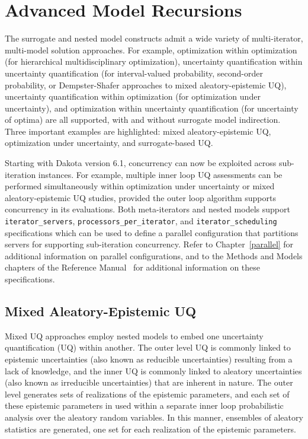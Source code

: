 \chapter{Advanced Model Recursions} \label{adv_models}


The surrogate and nested model constructs admit a wide variety of
multi-iterator, multi-model solution approaches. For example,
optimization within optimization (for hierarchical multidisciplinary
optimization), uncertainty quantification within uncertainty
quantification (for interval-valued probability, second-order
probability, or Dempster-Shafer approaches to mixed aleatory-epistemic
UQ), uncertainty quantification within optimization (for optimization
under uncertainty), and optimization within uncertainty quantification
(for uncertainty of optima) are all supported, with and without
surrogate model indirection. Three important examples are highlighted:
mixed aleatory-epistemic UQ, optimization under uncertainty, and
surrogate-based UQ.

Starting with Dakota version 6.1, concurrency can now be exploited
across sub-iteration instances.  For example, multiple inner loop UQ
assessments can be performed simultaneously within optimization under
uncertainty or mixed aleatory-epistemic UQ studies, provided the outer
loop algorithm supports concurrency in its evaluations.  Both
meta-iterators and nested models support \texttt{iterator\_servers}, 
\texttt{processors\_per\_iterator}, and \texttt{iterator\_scheduling}
specifications which can be used to define a parallel configuration
that partitions servers for supporting sub-iteration concurrency.
Refer to Chapter~\ref{parallel} for additional information on parallel
configurations, and to the Methods and Models chapters of the Reference 
Manual~\cite{RefMan} for additional information on these specifications.


\section{Mixed Aleatory-Epistemic UQ} \label{adv_models:mixed_uq}

Mixed UQ approaches employ nested models to embed one uncertainty
quantification (UQ) within another. The outer level UQ is commonly
linked to epistemic uncertainties (also known as reducible
uncertainties) resulting from a lack of knowledge, and the inner UQ is
commonly linked to aleatory uncertainties (also known as irreducible
uncertainties) that are inherent in nature. The outer level generates
sets of realizations of the epistemic parameters, and each set of
these epistemic parameters in used within a separate inner loop
probabilistic analysis over the aleatory random variables. In this
manner, ensembles of aleatory statistics are generated, one set for
each realization of the epistemic parameters. %

